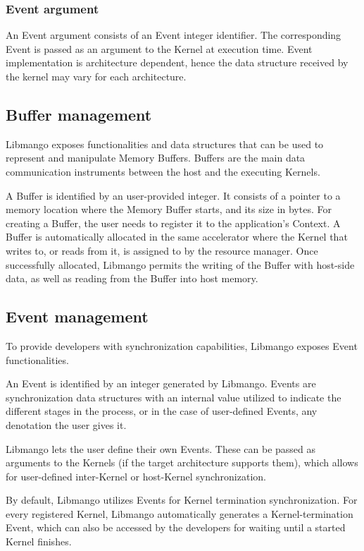 \subsubsection{Event argument}
An Event argument consists of an Event integer identifier. The corresponding Event is passed as an argument to the Kernel at execution time.
Event implementation is architecture dependent, hence the data structure received by the kernel may vary for each architecture.

\subsection{Buffer management}
Libmango exposes functionalities and data structures that can be used to represent and manipulate Memory Buffers. Buffers are the main data communication instruments between the host and the executing Kernels. 

A Buffer is identified by an user-provided integer. It consists of a pointer to a memory location where the Memory Buffer starts, and its size in bytes. 
For creating a Buffer, the user needs to register it to the application's Context. A Buffer is automatically allocated in the same accelerator where the Kernel that writes to, or reads from it, is assigned to by the resource manager.
Once successfully allocated, Libmango permits the writing of the Buffer with host-side data, as well as reading from the Buffer into host memory.


\subsection{Event management}
To provide developers with synchronization capabilities, Libmango exposes Event functionalities.

An Event is identified by an integer generated by Libmango. Events are synchronization data structures with an internal value utilized to indicate the different stages in the process, or in the case of user-defined Events, any denotation the user gives it.

Libmango lets the user define their own Events. These can be passed as arguments to the Kernels (if the target architecture supports them), which allows for user-defined inter-Kernel or host-Kernel synchronization.

By default, Libmango utilizes Events for Kernel termination synchronization. For every registered Kernel, Libmango automatically generates a Kernel-termination Event, which can also be accessed by the developers for waiting until a started Kernel finishes.

